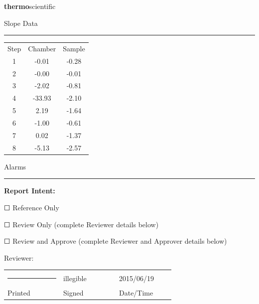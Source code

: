 \documentclass[UTF8,10pt,a4paper,fontset=fandol]{ctexart}
\newcommand{\fieldvalue}[1]{#1}
\newcommand{\handwritten}[1]{#1}
\newcommand{\checkboxfield}[1]{\ifstrequal{#1}{checked}{☑}{\ifstrequal{#1}{unclear}{?}{☐}}}
\begin{document}
\newpage

\noindent
\begin{flushright}
\textsf{\textbf{thermo}}\textsf{scientific}
\end{flushright}

\vspace{1.2cm}

\noindent
\begin{minipage}[t]{0.34\linewidth}
\centering
Slope Data\\[-0.2em]
\rule{\linewidth}{0.4pt}

\begin{tabular}{c c c}
Step & Chamber & Sample\\
1 & -0.01 & -0.28\\
2 & -0.00 & -0.01\\
3 & -2.02 & -0.81\\
4 & -33.93 & -2.10\\
5 & 2.19 & -1.64\\
6 & -1.00 & -0.61\\
7 & 0.02 & -1.37\\
8 & -5.13 & -2.57
\end{tabular}
\end{minipage}
\hfill
\begin{minipage}[t]{0.55\linewidth}
\centering
Alarms\\[-0.2em]
\rule{\linewidth}{0.4pt}
\end{minipage}

\vspace{0.7cm}

\noindent\textbf{Report Intent:}

\noindent
\fieldvalue{\checkboxfield{unchecked}} Reference Only

\noindent
\fieldvalue{\checkboxfield{unchecked}} Review Only (complete Reviewer details below)

\noindent
\fieldvalue{\checkboxfield{unchecked}} Review and Approve (complete Reviewer and Approver details below)

\vspace{0.45cm}

\noindent Reviewer:

\vspace{0.05cm}
\noindent
\begin{tabular}{p{0.25\linewidth} p{0.25\linewidth} p{0.25\linewidth}}
\rule{\linewidth}{0.4pt} &
\fieldvalue{\handwritten{illegible}} &
\fieldvalue{\handwritten{2015/06/19}}\\
Printed & Signed & Date/Time
\end{tabular}
\end{document}
